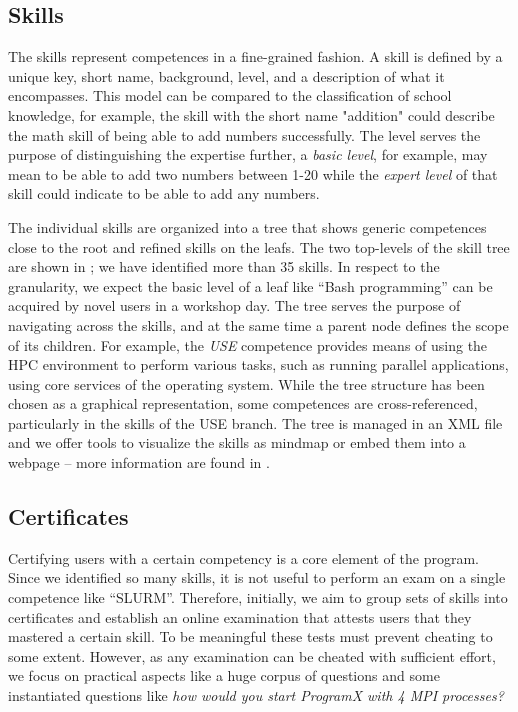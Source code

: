 \documentclass[jocse]{jocseart}
\begin{document}
\subsection{Skills}

The skills represent competences in a fine-grained fashion.
A skill is defined by a unique key, short name, background, level, and a description of what it encompasses.
This model can be compared to the classification of school knowledge, for example, the skill with the short name "addition" could describe the math skill of being able to add numbers successfully.
The level serves the purpose of distinguishing the expertise further, a \textit{basic level}, for example, may mean to be able to add two numbers between 1-20 while the \textit{expert level} of that skill could indicate to be able to add any numbers.

The individual skills are organized into a tree that shows generic competences close to the root and refined skills on the leafs.
The two top-levels of the skill tree are shown in ; we have identified more than 35 skills.
In respect to the granularity, we expect the basic level of a leaf like “Bash programming” can be acquired by novel users in a workshop day.
The tree serves the purpose of navigating across the skills, and at the same time a parent node defines the scope of its children.
For example, the \textit{USE} competence provides means of using the HPC environment to perform various tasks, such as running parallel applications, using core services of the operating system.
While the tree structure has been chosen as a graphical representation, some competences are cross-referenced, particularly in the skills of the USE branch.
The tree is managed in an XML file and we offer tools to visualize the skills as mindmap or embed them into a webpage -- more information are found in \cite{whitepaper}.

\subsection{Certificates}

Certifying users with a certain competency is a core element of the program.
Since we identified so many skills, it is not useful to perform an exam on a single competence like “SLURM”.
Therefore, initially, we aim to group sets of skills into certificates and establish an online examination that attests users that they mastered a certain skill.
To be meaningful these tests must prevent cheating to some extent.
However, as any examination can be cheated with sufficient effort, we focus on practical aspects like a huge corpus of questions and some instantiated questions like \textit{how would you start ProgramX with 4 MPI processes?}
\end{document}
